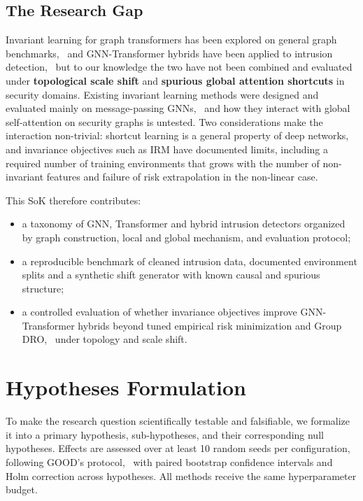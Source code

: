 \documentclass[a4paper,10pt]{article}
\begin{document}
\subsection{The Research Gap}

Invariant learning for graph transformers has been explored on general graph benchmarks,~\cite{liao2026igt} and GNN-Transformer hybrids have been applied to intrusion detection,~\cite{xie2026hybrid,appiahene2026hybrid,zhang2024icist} but to our knowledge the two have not been combined and evaluated under \textbf{topological scale shift} and \textbf{spurious global attention shortcuts} in security domains. Existing invariant learning methods were designed and evaluated mainly on message-passing GNNs,~\cite{wu2022dir,wu2022eerm,gui2022good} and how they interact with global self-attention on security graphs is untested. Two considerations make the interaction non-trivial: shortcut learning is a general property of deep networks,~\cite{geirhos2020shortcut} and invariance objectives such as IRM have documented limits, including a required number of training environments that grows with the number of non-invariant features and failure of risk extrapolation in the non-linear case.~\cite{rosenfeld2021risks}

This SoK therefore contributes:
\begin{itemize}
    \item a taxonomy of GNN, Transformer and hybrid intrusion detectors organized by graph construction, local and global mechanism, and evaluation protocol;
    \item a reproducible benchmark of cleaned intrusion data, documented environment splits and a synthetic shift generator with known causal and spurious structure;
    \item a controlled evaluation of whether invariance objectives improve GNN-Transformer hybrids beyond tuned empirical risk minimization and Group DRO,~\cite{sagawa2020dro} under topology and scale shift.
\end{itemize}

\section{Hypotheses Formulation}
\label{sec:hypotheses}

To make the research question scientifically testable and falsifiable, we formalize it into a primary hypothesis, sub-hypotheses, and their corresponding null hypotheses. Effects are assessed over at least 10 random seeds per configuration, following GOOD's protocol,~\cite{gui2022good} with paired bootstrap confidence intervals and Holm correction across hypotheses. All methods receive the same hyperparameter budget.
\end{document}
